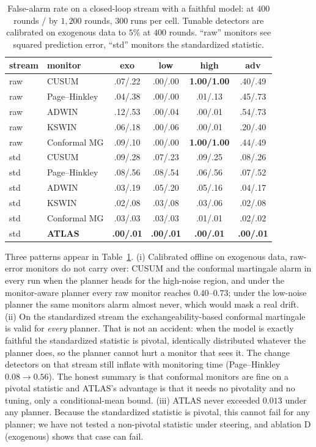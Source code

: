 \begin{table}[t]\centering
\caption{False-alarm rate on a closed-loop stream with a faithful model: at $400$ rounds / by $1{,}200$ rounds, $300$ runs per cell. Tunable detectors are calibrated on exogenous data to $5\%$ at $400$ rounds. ``raw'' monitors see squared prediction error, ``std'' monitors the standardized statistic.}
\label{tab:endo}
\small
\setlength{\tabcolsep}{4pt}
\begin{tabular}{@{}llcccc@{}}
\toprule
stream & monitor & exo & low & high & adv \\
\midrule
raw & CUSUM            & .07/.22 & .00/.00 & \textbf{1.00/1.00} & .40/.49 \\
raw & Page--Hinkley    & .04/.38 & .00/.00 & .01/.13 & .45/.73 \\
raw & ADWIN            & .12/.53 & .00/.04 & .00/.01 & .54/.73 \\
raw & KSWIN            & .06/.18 & .00/.06 & .00/.01 & .20/.40 \\
raw & Conformal MG     & .09/.10 & .00/.00 & \textbf{1.00/1.00} & .44/.49 \\
\midrule
std & CUSUM            & .09/.28 & .07/.23 & .09/.25 & .08/.26 \\
std & Page--Hinkley    & .08/.56 & .08/.54 & .06/.56 & .07/.52 \\
std & ADWIN            & .03/.19 & .05/.20 & .05/.16 & .04/.17 \\
std & KSWIN            & .02/.08 & .03/.08 & .03/.06 & .02/.08 \\
std & Conformal MG     & .03/.03 & .03/.03 & .01/.01 & .02/.02 \\
\midrule
std & \textbf{ATLAS}   & \textbf{.00/.01} & \textbf{.00/.01} & \textbf{.00/.01} & \textbf{.00/.01} \\
\bottomrule
\end{tabular}
\end{table}

Three patterns appear in Table~\ref{tab:endo}. (i) Calibrated offline on exogenous data, raw-error monitors do not carry over: CUSUM and the conformal martingale alarm in every run when the planner heads for the
high-noise region, and under the monitor-aware planner every raw monitor reaches $0.40$--$0.73$; under the low-noise planner the same monitors alarm almost never, which would mask a real drift. (ii) On the
standardized stream the exchangeability-based conformal martingale is valid for \emph{every} planner. That is not an accident: when the model is exactly faithful the standardized statistic is pivotal, identically distributed whatever the planner does, so the planner cannot hurt a monitor that
sees it. The change detectors on that stream still inflate with monitoring time (Page--Hinkley $0.08\to0.56$). The honest summary is that conformal monitors are fine on a pivotal statistic and ATLAS's advantage is that it needs no
pivotality and no tuning, only a conditional-mean bound. (iii) ATLAS never exceeded $0.013$ under any planner. Because the standardized statistic is pivotal, this cannot fail for any planner; we have not tested a non-pivotal statistic under steering, and ablation D (exogenous) shows that case can fail.


